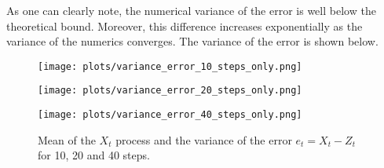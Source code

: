 \documentclass[a4paper,12pt]{article} %
\begin{document}
As one can clearly note, the numerical variance of the error is well below the theoretical bound. Moreover, this difference increases exponentially as the variance of the numerics converges. The variance of the error is shown below.
\begin{figure}[H]
    \centering
    \begin{minipage}{0.6\textwidth}
        \centering
        \texttt{[image: plots/variance\_error\_10\_steps\_only.png]}
    \end{minipage}
    \hfill

    \vspace{0.5cm}
    \begin{minipage}{0.6\textwidth}
        \centering
        \texttt{[image: plots/variance\_error\_20\_steps\_only.png]}
    \end{minipage}
    \hfill

    \vspace{0.5cm}
    \begin{minipage}{0.6\textwidth}
        \centering
        \texttt{[image: plots/variance\_error\_40\_steps\_only.png]}
    \end{minipage}
    \hfill



    \caption{Mean of the \(X_t\) process and the variance of the error \(e_t =X_t -Z_t\)  for 10, 20 and 40 steps.}
\end{figure}
\end{document}
